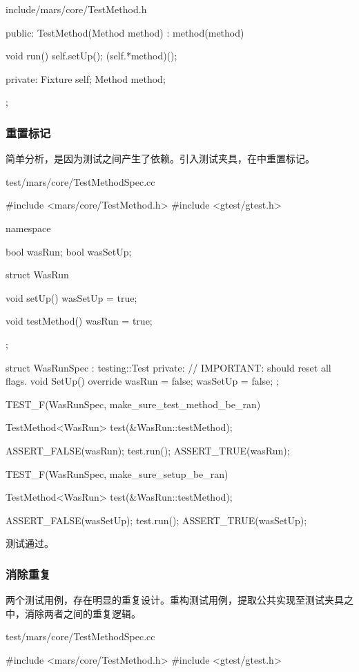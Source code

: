 \begin{content}
\begin{diff}{include/mars/core/TestMethod.h}
\begin{minicpp}
{public:
  TestMethod(Method method)
    : method(method) {}

  void run() {
    self.setUp();
    (self.*method)();
  }

private:
  Fixture self;
  Method method;
};
\end{minicpp}
\end{diff}

\subsubsection{重置标记}

简单分析，是因为测试之间产生了依赖。引入测试夹具，在中重置标记。

\begin{nodiff}{test/mars/core/TestMethodSpec.cc}
\begin{c++}
#include <mars/core/TestMethod.h>
#include <gtest/gtest.h>

namespace {
  bool wasRun;
  bool wasSetUp;

  struct WasRun {
    void setUp() {
      wasSetUp = true;
    }

    void testMethod() {
      wasRun = true;
    }
  };

  struct WasRunSpec : testing::Test {
  private:
    // IMPORTANT: should reset all flags.
    void SetUp() override {
      wasRun = false;
      wasSetUp = false;
    }
  };
}

TEST_F(WasRunSpec, make_sure_test_method_be_ran) {
  TestMethod<WasRun> test(&WasRun::testMethod);

  ASSERT_FALSE(wasRun);
  test.run();
  ASSERT_TRUE(wasRun);
}

TEST_F(WasRunSpec, make_sure_setup_be_ran) {
  TestMethod<WasRun> test(&WasRun::testMethod);

  ASSERT_FALSE(wasSetUp);
  test.run();
  ASSERT_TRUE(wasSetUp);
}
\end{c++}
\end{nodiff}

测试通过。

\subsubsection{消除重复}

两个测试用例，存在明显的重复设计。重构测试用例，提取公共实现至测试夹具之中，消除两者之间的重复逻辑。

\begin{nodiff}{test/mars/core/TestMethodSpec.cc}
\begin{c++}
#include <mars/core/TestMethod.h>
#include <gtest/gtest.h>


\end{c++}
\end{nodiff}
\end{content}
